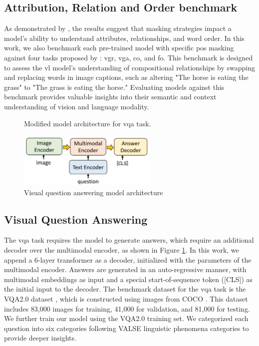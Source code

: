 \subsection{Attribution, Relation and Order benchmark}
As demonstrated by , the results suggest that masking strategies impact a model’s ability to understand attributes, relationships, and word order. 
In this work, we also benchmark each pre-trained model with specific \acrshort{pos} masking against four tasks proposed by : \acrfull{vgr}, \acrfull{vga}, \acrfull{co}, and \acrfull{fo}. 
This benchmark is designed to assess the \acrshort{vl} model’s understanding of compositional relationships by swapping and replacing words in image captions, such as altering "The horse is eating the grass" to "The grass is eating the horse." 
Evaluating models against this benchmark provides valuable insights into their semantic and context understanding of vision and language modality.

\begin{figure}[h]
    \caption{Visual question answering model architecture}
    \label{fig:vqa}
    Modified model architecture for \acrshort{vqa} task.
    \begin{center}
        \includegraphics[width=0.6\textwidth]{Images/vqa_method.png}
    \end{center}
    \small
\end{figure}

\subsection{Visual Question Answering}
The \acrfull{vqa} task requires the model to generate answers, which require an additional decoder over the multimodal encoder, as shown in Figure \ref{fig:vqa}. 
In this work, we append a 6-layer transformer as a decoder, initialized with the parameters of the multimodal encoder. 
Answers are generated in an auto-regressive manner, with multimodal embeddings as input and a special start-of-sequence token ([CLS]) as the initial input to the decoder.
The benchmark dataset for the \acrshort{vqa} task is the VQA2.0 dataset \cite{vqa2}, which is constructed using images from COCO \cite{mscoco}. 
This dataset includes 83,000 images for training, 41,000 for validation, and 81,000 for testing.
We further train our model using the VQA2.0 training set.
We categorized each question into six categories following VALSE linguistic phenomena categories to provide deeper insights.
